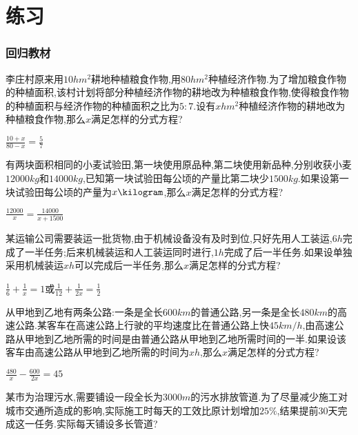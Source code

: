 \documentclass[cn,blue,12pt]{elegantbook}
\begin{document}
\section{练习}%
\label{sec:练习}

\subsubsection{回归教材}%
\begin{shiti}
\item 李庄村原来用\( 10 hm^2 \)耕地种植粮食作物,用\( 80 hm^2 \)种植经济作物.为了增加粮食作物的种植面积,该村计划将部分种植经济作物的耕地改为种植粮食作物,使得粮食作物的种植面积与经济作物的种植面积之比为\( 5:7. \)设有\( x hm^2 \)种植经济作物的耕地改为种植粮食作物,那么\( x \)满足怎样的分式方程?
\begin{solution}
        \(\frac{10+x}{80-x}=\frac{5}{7}\)
\end{solution}
\item 有两块面积相同的小麦试验田,第一块使用原品种,第二块使用新品种,分别收获小麦\( 12 000 kg \)和\( 14 000 kg\),已知第一块试验田每公顷的产量比第二块少\( 1 500 kg. \)如果设第一块试验田每公顷的产量为\( x \kilogram \),那么\( x \)满足怎样的分式方程?
\begin{solution}
\(\frac{12000}{x}=\frac{14000}{x+1500}\)
\end{solution}
\item 某运输公司需要装运一批货物,由于机械设备没有及时到位,只好先用人工装运,\( 6 h\)完成了一半任务;后来机械装运和人工装运同时进行,\( 1 h \)完成了后一半任务.如果设单独采用机械装运\( x h \)可以完成后一半任务,那么\( x \)满足怎样的分式方程?
\begin{solution}
        \(\frac{1}{6}+\frac{1}{x}=1\)或\(\frac{1}{12}+\frac{1}{2x}=\frac{1}{2}\)
\end{solution}
\item 从甲地到乙地有两条公路:一条是全长\( 600 km \)的普通公路,另一条是全长\( 480 km \)的高速公路.某客车在高速公路上行驶的平均速度比在普通公路上快\( 45 km/h\),由高速公路从甲地到乙地所需的时间是由普通公路从甲地到乙地所需时间的一半.如果设该客车由高速公路从甲地到乙地所需的时间为\( x h\),那么\( x \)满足怎样的分式方程?
\begin{solution}
        \(\frac{480}{x}-\frac{600}{2x}=45\)
\end{solution}
\item 某市为治理污水,需要铺设一段全长为\( 3 000 m \)的污水排放管道.为了尽量减少施工对城市交通所造成的影响,实际施工时每天的工效比原计划增加\( 25\%\),结果提前\( 30 \)天完成这一任务.实际每天铺设多长管道?

\end{shiti}
\end{document}
